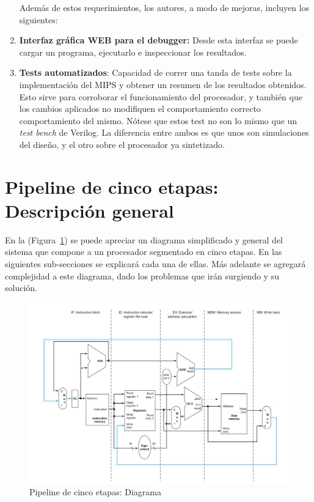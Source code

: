 \documentclass[12pt]{article}
\begin{document}
\begin{enumerate}
      Además de estos requerimientos, los autores, a modo de mejoras, incluyen los siguientes: \\

      \item \textbf{Interfaz gráfica WEB para el debugger:} Desde esta interfaz se puede cargar un programa, ejecutarlo e inspeccionar los resultados.
      \item \textbf{Tests automatizados}: Capacidad de correr una tanda de tests sobre la implementación del MIPS y obtener un resumen de los resultados obtenidos. Esto sirve para corroborar el funcionamiento del procesador, y también que los cambios aplicados no modifiquen el comportamiento correcto comportamiento del mismo. Nótese que estos test no son lo mismo que un \textit{test bench} de Verilog. La diferencia entre ambos es que unos son simulaciones del diseño, y el otro sobre el procesador ya sintetizado.
\end{enumerate}

\section{Pipeline de cinco etapas: Descripción general}

En la (Figura~\ref{fig:pipeline}) se puede apreciar un diagrama simplificado y general del sistema que compone a un procesador segmentado en cinco etapas. En las siguientes sub-secciones se explicará cada una de ellas. Más adelante se agregará complejidad a este diagrama, dado los problemas que irán surgiendo y su solución.

\begin{figure}[ht]
\centering
\hspace*{-1cm}
\includegraphics[width=1.1\textwidth]{imagenes/esquema_pipeline.jpeg}
\caption{Pipeline de cinco etapas: Diagrama \cite{patterson}}
\label{fig:pipeline}
\end{figure}
\end{document}

